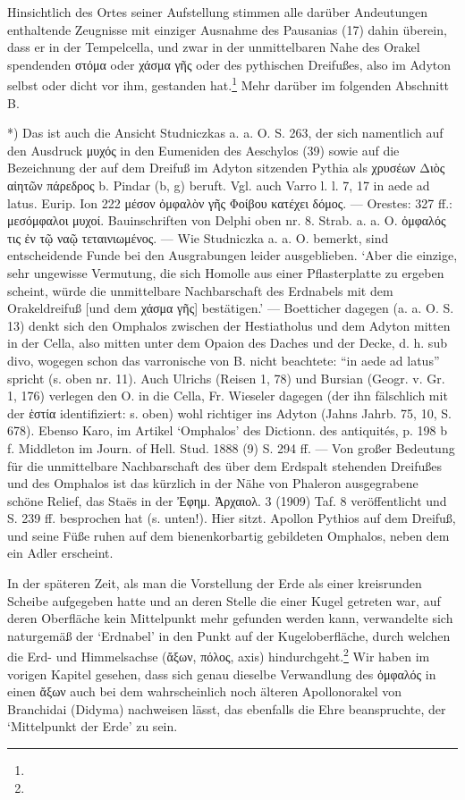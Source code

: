 \documentclass[a4paper, 11pt, oneside]{article}
\begin{document}
Hinsichtlich des Ortes seiner Aufstellung stimmen alle darüber Andeutungen enthaltende Zeugnisse mit einziger Ausnahme des Pausanias (17) dahin überein, dass er in der Tempelcella, und zwar in der unmittelbaren Nahe des Orakel spendenden στόμα oder χάσμα γῆς oder des pythischen Dreifußes, also im Adyton selbst oder dicht vor ihm, gestanden hat.\footnote{} Mehr darüber im folgenden Abschnitt B.

*) Das ist auch die Ansicht Studniczkas a. a. O. S. 263, der sich namentlich auf den Ausdruck μυχός in den Eumeniden des Aeschylos (39) sowie auf die Bezeichnung der auf dem Dreifuß im Adyton sitzenden Pythia als χρυσέων Διὸς αἰητῶν πάρεδρος b. Pindar (b, g) beruft. Vgl. auch Varro l. l. 7, 17 in aede ad latus. Eurip. Ion 222 μέσον ὀμφαλὸν γῆς Φοίβου κατέχει δόμος. --- Orestes: 327 ff.: μεσόμφαλοι μυχοί. Bauinschriften von Delphi oben nr. 8. Strab. a. a. O. ὀμφαλός τις ἐν τῷ ναῷ τεταινιωμένος. --- Wie Studniczka a. a. O. bemerkt, sind entscheidende Funde bei den Ausgrabungen leider ausgeblieben. `Aber die einzige, sehr ungewisse Vermutung, die sich Homolle aus einer Pflasterplatte zu ergeben scheint, würde die unmittelbare Nachbarschaft des Erdnabels mit dem Orakeldreifuß [und dem χάσμα γῆς] bestätigen.' --- Boetticher dagegen (a. a. O. S. 13) denkt sich den Omphalos zwischen der Hestiatholus und dem Adyton mitten in der Cella, also mitten unter dem Opaion des Daches und der Decke, d. h. sub divo, wogegen schon das varronische von B. nicht beachtete: "`in aede ad latus"' spricht (s. oben nr. 11). Auch Ulrichs (Reisen 1, 78) und Bursian (Geogr. v. Gr. 1, 176) verlegen den O. in die Cella, Fr. Wieseler dagegen (der ihn fälschlich mit der ἑστία identifiziert: s. oben) wohl richtiger ins Adyton (Jahns Jahrb. 75, 10, S. 678). Ebenso Karo, im Artikel `Omphalos' des Dictionn. des antiquités, p. 198 b f. Middleton im Journ. of Hell. Stud. 1888 (9) S. 294 ff. --- Von großer Bedeutung für die unmittelbare Nachbarschaft des über dem Erdspalt stehenden Dreifußes und des Omphalos ist das kürzlich in der Nähe von Phaleron ausgegrabene schöne Relief, das Staës in der Ἐφημ. Ἀρχαιολ. 3 (1909) Taf. 8 veröffentlicht und S. 239 ff. besprochen hat (s. unten!). Hier sitzt. Apollon Pythios auf dem Dreifuß, und seine Füße ruhen auf dem bienenkorbartig gebildeten Omphalos, neben dem ein Adler erscheint.

In der späteren Zeit, als man die Vorstellung der Erde als einer kreisrunden Scheibe aufgegeben hatte und an deren Stelle die einer Kugel getreten war, auf deren Oberfläche kein Mittelpunkt mehr gefunden werden kann, verwandelte sich naturgemäß der `Erdnabel' in den Punkt auf der Kugeloberfläche, durch welchen die Erd- und Himmelsachse (ἄξων, πόλος, axis) hindurchgeht.\footnote{} Wir haben im vorigen Kapitel gesehen, dass sich genau dieselbe Verwandlung des ὀμφαλός in einen ἄξων auch bei dem wahrscheinlich noch älteren Apollonorakel von Branchidai (Didyma) nachweisen lässt, das ebenfalls die Ehre beanspruchte, der `Mittelpunkt der Erde' zu sein.
\end{document}
